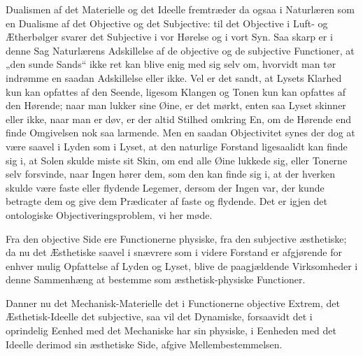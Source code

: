 \documentclass[12pt]{book}
\newcommand{\opage}[1]{\marginnote{\footnotesize\textit{[#1]}}}
\begin{document}
Dualismen af det Materielle og det Ideelle fremtræder da ogsaa i Naturlæren som en Dualisme af
det Objective og det Subjective: til det Objective i Luft- og Ætherbølger svarer det Subjective
i vor Hørelse og i vort Syn. Saa skarp er i denne Sag Naturlærens Adskillelse af de objective
og de subjective Functioner, at „den sunde Sands“ ikke ret kan blive enig med sig selv om,
hvorvidt man tør indrømme en saadan Adskillelse eller ikke. Vel er det sandt, at Lysets Klarhed
kun kan opfattes af den Seende, ligesom Klangen og Tonen kun kan opfattes af den Hørende; naar
man lukker sine Øine, er det mørkt, enten saa Lyset skinner eller ikke, naar man er døv, er der
altid Stilhed omkring En, om de Hørende end finde Omgivelsen nok saa larmende. Men en saadan
Objectivitet synes der dog at være saavel i Lyden som i Lyset, at den naturlige Forstand
ligesaalidt kan finde sig i, at Solen skulde miste sit Skin, om end alle Øine lukkede sig,
eller Tonerne selv forsvinde, naar Ingen hører dem, som den kan finde sig i, at der hverken
skulde være faste eller flydende Legemer, dersom der Ingen var, der kunde betragte dem og give
dem Prædicater af faste og flydende. Det er igjen det ontologiske Objectiveringsproblem, vi her
møde.

Fra den objective Side ere Functionerne physiske, fra den subjective æsthetiske; da nu det
Æsthetiske saavel i snævrere som i videre Forstand er afgjørende for enhver mulig
\opage{384} Opfattelse af Lyden og Lyset, blive de paagjældende Virksomheder i denne Sammenhæng at bestemme
som æsthetisk-physiske Functioner.

Danner nu det Mechanisk-Materielle det i Functionerne objective Extrem, det Æsthetisk-Ideelle
det subjective, saa vil det Dynamiske, forsaavidt det i oprindelig Eenhed med det Mechaniske
har sin physiske, i Eenheden med det Ideelle derimod sin æsthetiske Side, afgive
Mellembestemmelsen.
\end{document}
